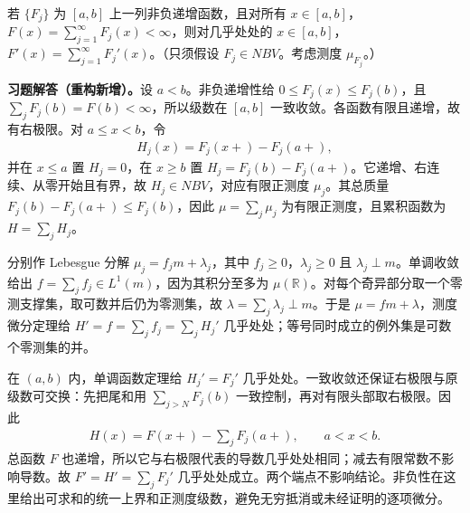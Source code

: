 \documentclass[../../main.tex]{subfiles}%
\begin{document}
\begin{exercise}\label{exercise:ch03-monotone-series-derivative}
若 $\{F_j\}$ 为 $[a,b]$ 上一列非负递增函数，且对所有 $x\in[a,b]$，$F(x)=\sum_{j=1}^{\infty}F_j(x)<\infty$，则对几乎处处的 $x\in[a,b]$，$F'(x)=\sum_{j=1}^{\infty}F_j'(x)$。（只须假设 $F_j\in NBV$。考虑测度 $\mu_{F_j}$。）
\end{exercise}
\begin{solution}
\label{solution:ch03-monotone-series-derivative}
\textbf{习题解答（重构新增）。}设 $a<b$。非负递增性给 $0\le F_j(x)\le F_j(b)$，且 $\sum_jF_j(b)=F(b)<\infty$，所以级数在 $[a,b]$ 一致收敛。各函数有限且递增，故有右极限。对 $a\le x<b$，令
\begin{align*}
H_j(x)=F_j(x+)-F_j(a+),
\end{align*}
并在 $x\le a$ 置 $H_j=0$，在 $x\ge b$ 置 $H_j=F_j(b)-F_j(a+)$。它递增、右连续、从零开始且有界，故 $H_j\in NBV$，对应有限正测度 $\mu_j$。其总质量 $F_j(b)-F_j(a+)\le F_j(b)$，因此 $\mu=\sum_j\mu_j$ 为有限正测度，且累积函数为 $H=\sum_jH_j$。

分别作 Lebesgue 分解 $\mu_j=f_jm+\lambda_j$，其中 $f_j\ge0$，$\lambda_j\ge0$ 且 $\lambda_j\perp m$。单调收敛给出 $f=\sum_jf_j\in L^1(m)$，因为其积分至多为 $\mu(\mathbb R)$。对每个奇异部分取一个零测支撑集，取可数并后仍为零测集，故 $\lambda=\sum_j\lambda_j\perp m$。于是 $\mu=fm+\lambda$，测度微分定理给 $H'=f=\sum_j f_j=\sum_jH_j'$ 几乎处处；等号同时成立的例外集是可数个零测集的并。

在 $(a,b)$ 内，单调函数定理给 $H_j'=F_j'$ 几乎处处。一致收敛还保证右极限与原级数可交换：先把尾和用 $\sum_{j>N}F_j(b)$ 一致控制，再对有限头部取右极限。因此
\begin{align*}
H(x)=F(x+)-\sum_jF_j(a+),\qquad a<x<b.
\end{align*}
总函数 $F$ 也递增，所以它与右极限代表的导数几乎处处相同；减去有限常数不影响导数。故 $F'=H'=\sum_jF_j'$ 几乎处处成立。两个端点不影响结论。非负性在这里给出可求和的统一上界和正测度级数，避免无穷抵消或未经证明的逐项微分。
\end{solution}
\end{document}
